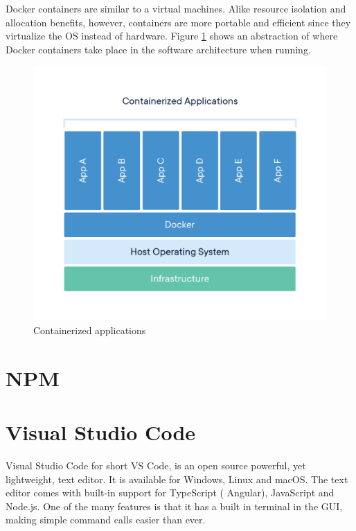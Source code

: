 \documentclass[a4paper,11pt]{report}
\begin{document}
	Docker containers are similar to a virtual machines. Alike resource isolation and allocation benefits, however, containers are more portable and efficient since they virtualize the OS instead of hardware.\cite{dockerContainer} Figure \ref{dockerEnvironment} shows an abstraction of where Docker containers take place in the software architecture when running.

\begin{figure}[h]
\centering
  \includegraphics[width = 16cm]{container-what-is-container.png}
  \caption{ Containerized applications \cite{dockerContainer}}
  \label{dockerEnvironment}
\end{figure}

\section{NPM}

\section{Visual Studio Code}
\label{vsCode}

Visual Studio Code for short VS Code, is an open source powerful, yet lightweight, text editor. It is available for Windows, Linux and macOS. The text editor comes with built-in support for TypeScript ( Angular), JavaScript and Node.js. One of the many features is that it has a built in terminal in the GUI, making simple command calls easier than ever.
\end{document}
